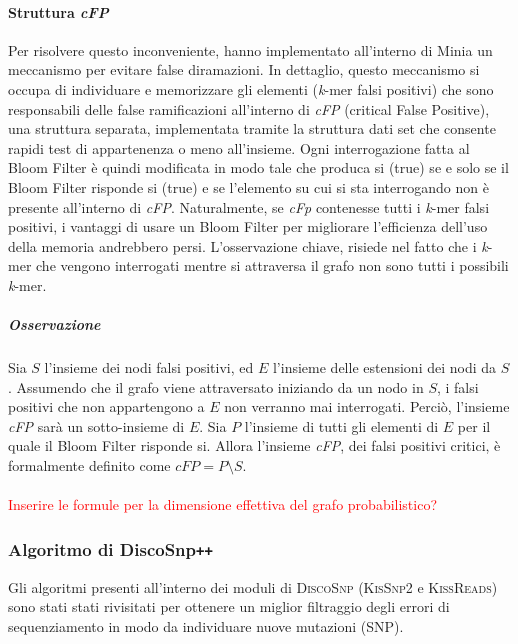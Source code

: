 \documentclass[../main.tex]{subfiles}
\begin{document}
\paragraph{Struttura \textit{cFP}} Per risolvere questo inconveniente,\cite{chikhi2013space} hanno implementato all'interno di Minia un meccanismo per evitare false diramazioni. In dettaglio, questo meccanismo si occupa di individuare e memorizzare gli elementi (\textit{k}-mer falsi positivi) che sono responsabili delle false ramificazioni all'interno di \textit{cFP} (critical False Positive), una struttura separata, implementata tramite la struttura dati set che consente rapidi test di appartenenza o meno all'insieme. Ogni interrogazione fatta al Bloom Filter è quindi modificata in modo tale che produca si (true) se e solo se il Bloom Filter risponde si (true) e se l'elemento su cui si sta interrogando non è presente all'interno di \textit{cFP}. Naturalmente, se \textit{cFp} contenesse tutti i \textit{k}-mer falsi positivi, i vantaggi di usare un Bloom Filter per migliorare l'efficienza dell'uso della memoria andrebbero persi. L'osservazione chiave, risiede nel fatto che i \textit{k}-mer che vengono interrogati mentre si attraversa il grafo non sono tutti i possibili \textit{k}-mer. 

\subparagraph{Osservazione} Sia $S$ l'insieme dei nodi falsi positivi, ed $E$ l'insieme delle estensioni dei nodi da $S$. Assumendo che il grafo viene attraversato iniziando da un nodo in $S$, i falsi positivi che non appartengono a $E$ non verranno mai interrogati. Perciò, l'insieme \textit{cFP} sarà un sotto-insieme di $E$. Sia $P$ l'insieme di tutti gli elementi di $E$ per il quale il Bloom Filter risponde si. Allora l'insieme \textit{cFP}, dei falsi positivi critici, è formalmente definito come $cFP = P \setminus S$.

\noindent
\paragraph{}\textcolor{red}{Inserire le formule per la dimensione effettiva del grafo probabilistico?}

\subsubsection{Algoritmo di DiscoSnp\texttt{++}}

Gli algoritmi presenti all'interno dei moduli di \textsc{DiscoSnp} (\textsc{KisSnp2} e \textsc{KissReads}) sono stati stati rivisitati per ottenere un miglior filtraggio degli errori di sequenziamento in modo da individuare nuove mutazioni (SNP). 
\end{document}
